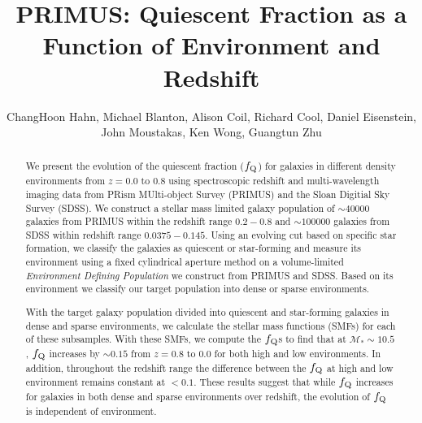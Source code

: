 \documentclass{emulateapj}
\begin{document}
\title{PRIMUS: Quiescent Fraction as a Function of Environment and Redshift}
\author{ChangHoon Hahn, Michael Blanton, Alison Coil, Richard Cool, Daniel Eisenstein, John Moustakas, Ken Wong, Guangtun Zhu}

\begin{abstract}
We present the evolution of the quiescent fraction ($f_{\rm{Q}}$) for galaxies in 
different density environments from $z=0.0$ to $0.8$ using spectroscopic 
redshift and multi-wavelength imaging data from PRism MUlti-object 
Survey (PRIMUS) and the Sloan Digitial Sky Survey (SDSS). We construct 
a stellar mass limited galaxy population of 
$\sim 40000$ galaxies from PRIMUS within the redshift range $0.2-0.8$ and $\sim 100000$
galaxies from SDSS within redshift range $0.0375-0.145$. Using an evolving cut based on
specific star formation, we classify the galaxies as quiescent or star-forming and
measure its environment using a fixed cylindrical aperture method 
on a volume-limited {\em Environment Defining Population} we construct 
from PRIMUS and SDSS. Based on its environment we classify our target
population into dense or sparse environments.   

With the target galaxy population divided into quiescent and star-forming galaxies 
in dense and sparse environments, we calculate the stellar mass functions 
(SMFs) for each of these subsamples. %
With these SMFs, we compute the $f_{\rm{Q}}$s to find that at 
$\mathcal{M}_{*} \sim 10.5$, $f_{\rm{Q}}$ increases by $\sim 0.15$ from 
$z=0.8$ to $0.0$ for both high and low environments. 
In addition, throughout the redshift range the difference between the
$f_{\rm{Q}}$ at high and low environment remains constant at $< 0.1$. 
These results suggest that while $f_{\rm{Q}}$ increases for galaxies in 
both dense and sparse environments over redshift, the evolution of $f_{\rm{Q}}$ 
is independent of environment. 
\end{abstract}

\end{document}
